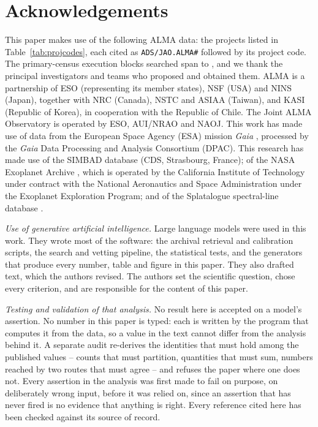 \section*{Acknowledgements}
This paper makes use of the following ALMA data: the \NProjCodes{} projects
listed in Table~\ref{tab:projcodes}, each cited as \texttt{ADS/JAO.ALMA\#}
followed by its project code. The \NEB{} primary-census execution blocks
searched span \PrEbDateFirst{} to \PrEbDateLast{}, and we thank the principal
investigators and teams who proposed and obtained
them.\ProjCodeUnresClause{} ALMA is a partnership of ESO
(representing its member states), NSF (USA) and NINS (Japan), together with NRC
(Canada), NSTC and ASIAA (Taiwan), and KASI (Republic of Korea), in cooperation
with the Republic of Chile. The Joint ALMA Observatory is operated by ESO,
AUI/NRAO and NAOJ. This work has made use of data from the European Space
Agency (ESA) mission {\it Gaia} \citep{GaiaDR3}, processed by the {\it Gaia}
Data Processing and Analysis Consortium (DPAC). This research has made use
of the SIMBAD database \citep{SIMBAD2000} (CDS, Strasbourg, France); of the
NASA Exoplanet Archive \citep{NEA2013}, which is operated by the California
Institute of Technology under contract with the National Aeronautics and
Space Administration under the Exoplanet Exploration Program; and of the
Splatalogue spectral-line database \citep{Splatalogue2007}.

\emph{Use of generative artificial intelligence.} Large language models were
used in this work. They wrote most of the software: the archival retrieval and
calibration scripts, the search and vetting pipeline, the statistical tests,
and the generators that produce every number, table and figure in this paper.
They also drafted text, which the authors revised. The authors set the
scientific question, chose every criterion, and are responsible for the
content of this paper.

\emph{Testing and validation of that analysis.} No result here is accepted
on a model's assertion. No number in this paper is typed: each is written by
the program that computes it from the data, so a value in the text cannot
differ from the analysis behind it. A separate audit re-derives the
identities that must hold among the published values -- counts that must
partition, quantities that must sum, numbers reached by two routes that must
agree -- and refuses the paper where one does not. Every assertion in the
analysis was first made to fail on purpose, on deliberately wrong input,
before it was relied on, since an assertion that has never fired is no
evidence that anything is right. Every reference cited here has been checked
against its source of record.

